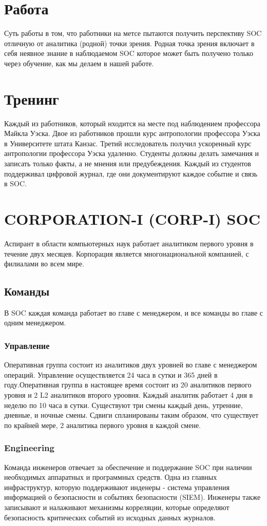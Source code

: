 \documentclass[12pt,]{article}
\begin{document}
\section{Работа}
Суть работы в том, что работники на метсе пытаются получить перспективу SOC отличную от аналитика (родной) точки зрения. Родная точка зрения включает в себя неявное знание в наблюдаемом SOC которое может быть получено только через обучение, как мы делаем в нашей работе.

\section{Тренинг}

Каждый из работников, который нходится на месте под наблюдением профессора Майкла Уэска.
Двое из работников прошли курс антропологии профессора Уэска в Университете штата Канзас. Третий исследователь получил ускоренный курс антропологии профессора Уэска удаленно. Студенты должны делать замечания и записать только факты, а не мнения или предубеждения.
Каждый из студентов поддерживал цифровой журнал, где они документируют каждое событие и связь в SOC.

\section{CORPORATION-I (CORP-I) SOC}
Аспирант в области компьютерных наук работает аналитиком первого уровня в течение двух месяцев. Корпорация является многонациональной компанией, с филиалами во всем мире.
\subsection{Команды}
В SOC каждая команда работает во главе с менеджером, и все команды во главе с одним менеджером.
\subsubsection{Управление}
Оперативная группа состоит из  аналитиков двух уровней во главе с менеджером операций. Управление осуществляется 24 часа в сутки и 365 дней в году.Оперативная группа в настоящее время состоит из
20 аналитиков первого уровня и 2 L2 аналитиков второго уроовня.  Каждый аналитик работает 4 дня в неделю по 10 часа в сутки. Существуют три смены каждый день, утренние, дневные, и ночные смены. Сдвиги спланированы таким образом, что существует по крайней мере, 2 аналитика первого уровня в каждой смене.
\subsubsection{Engineering}
Команда инженеров отвечает за обеспечение и поддержание SOC при наличии необходимых аппаратных и программных средств. Одна из главных инфраструктур, которую поддерживают инденеры - система управления информацией о безопасности и событиях безопасности (SIEM). Инженеры также записывают и налаживают механизмы корреляции, которые определяют безопасность критических событий из исходных данных журналов.
\end{document}
